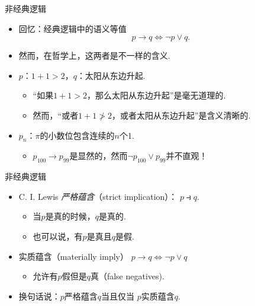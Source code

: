     \begin{frame}{非经典逻辑}
    \begin{itemize}
        \item 回忆：经典逻辑中的语义等值
        \[p\to q\iff\neg p\vee q.\]
        \item 然而，在哲学上，这两者是不一样的含义.
        \item $p$：$1+1>2$，$q$：太阳从东边升起.
        \begin{itemize}
            \item “如果$1+1>2$，那么太阳从东边升起”是毫无道理的.
            \item 然而，“或者$1+1\not>2$，或者太阳从东边升起”是含义清晰的.
        \end{itemize}
        \item $p_n$：$\pi$的小数位包含连续的$n$个1.
        \begin{itemize}
            \item $p_{100}\to p_{99}$是显然的，然而$\neg p_{100}\vee p_{99}$并不直观！
        \end{itemize}
    \end{itemize}
    \end{frame}
    
    \begin{frame}{非经典逻辑}
    
    \begin{itemize}
        \item C. I. Lewis \emph{严格蕴含}（strict implication）：
         $p\strictif q$.
        \begin{itemize}
            \item 
            当$p$是真的时候，$q$是真的.
            \item 也可以说，有$p$是真且$q$是假.
        \end{itemize}
            \item 实质蕴含（materially imply）
        $p\rightarrow q \iff
        \lnot {p}\vee q$
        \begin{itemize}
              \item 允许有$p$假但是$q$真（false negatives).
        \end{itemize}
        \item 换句话说：$p$严格蕴含$q$当且仅当 $p$实质蕴含$q$.
    \end{itemize}
    \end{frame}
    
